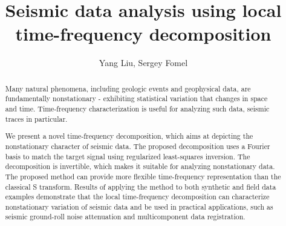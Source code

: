 \title{Seismic data analysis using local time-frequency decomposition}

\renewcommand{\thefootnote}{\fnsymbol{footnote}}


\address{
\footnotemark[1] College of Geo-exploration Science and Technology,\\
Jilin University \\
No.6 Xi minzhu street, \\
Changchun, China, 130026 \\
\footnotemark[2] Bureau of Economic Geology,\\
John A. and Katherine G. Jackson School of Geosciences \\
The University of Texas at Austin \\
University Station, Box X \\
Austin, TX, USA, 78713-8924}

\author{Yang Liu\footnotemark[1]\footnotemark[2], Sergey Fomel\footnotemark[2]}


\maketitle
\begin{abstract}
Many natural phenomena, including geologic
events and geophysical data, are fundamentally nonstationary -
exhibiting statistical variation that changes in space and
time. Time-frequency characterization is useful for analyzing such
data, seismic traces in particular. 

We present a novel time-frequency
decomposition, which aims at depicting the 
nonstationary character of seismic data. The proposed
decomposition uses a Fourier basis to match the target
signal using regularized least-squares inversion. The decomposition is
invertible, which makes it suitable for
analyzing nonstationary data. The proposed method can provide more
flexible time-frequency representation than the classical S
transform. Results of applying the method to both synthetic and field
data examples demonstrate that the local time-frequency
decomposition can characterize nonstationary
variation of seismic data and be used in practical
applications, such as seismic ground-roll noise attenuation and
multicomponent data registration.
\end{abstract}

